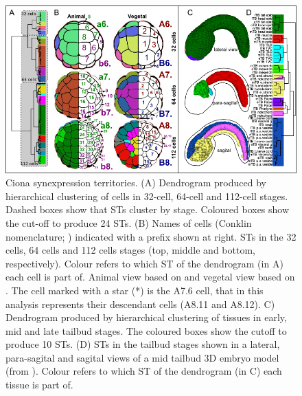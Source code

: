 \begin{figure}[!t]
  \includegraphics[width=\textwidth]{./Images/Art-II/territories.png}
  \centering
  \caption{Ciona synexpression territories. 
  (A) Dendrogram produced by hierarchical clustering of cells in 32-cell, 64-cell and 112-cell stages. Dashed boxes show that STs cluster by stage. Coloured boxes show the cut-off to produce 24 STs.
  (B) Names of cells (Conklin nomenclature; \citealp{Conklin1905}) indicated with a prefix shown at right. STs in the 32 cells, 64 cells and 112 cells stages (top, middle and bottom, respectively). Colour refers to which ST of the dendrogram (in A) each cell is part of. Animal view based on \citet{Nicol1988} and vegetal view based on \citet{Cole2004a}. The cell marked with a star (*) is the A7.6 cell, that in this analysis represents their descendant cells (A8.11 and A8.12).
  C) Dendrogram produced by hierarchical clustering of tissues in early, mid and late tailbud stages. The coloured boxes show the cutoff to produce 10 STs. (D) STs in the tailbud stages shown in a lateral, para-sagital and sagital views of a mid tailbud 3D embryo model (from \citealp{Nakamura2012}). Colour refers to which ST of the dendrogram (in C) each tissue is part of.
}
  \label{fig:Art-II-territories}
\end{figure}

